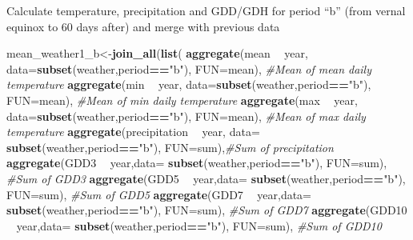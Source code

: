 \documentclass[10pt,]{article}
\newenvironment{Shaded}{\begin{snugshade}}{\end{snugshade}}
\newcommand{\KeywordTok}[1]{\textcolor[rgb]{0.13,0.29,0.53}{\textbf{#1}}}
\newcommand{\DataTypeTok}[1]{\textcolor[rgb]{0.13,0.29,0.53}{#1}}
\newcommand{\StringTok}[1]{\textcolor[rgb]{0.31,0.60,0.02}{#1}}
\newcommand{\CommentTok}[1]{\textcolor[rgb]{0.56,0.35,0.01}{\textit{#1}}}
\newcommand{\OperatorTok}[1]{\textcolor[rgb]{0.81,0.36,0.00}{\textbf{#1}}}
\newcommand{\NormalTok}[1]{#1}
\begin{document}
Calculate temperature, precipitation and GDD/GDH for period ``b'' (from
vernal equinox to 60 days after) and merge with previous data

\begin{Shaded}
\begin{Highlighting}[]
\NormalTok{mean_weather1_b<-}\KeywordTok{join_all}\NormalTok{(}\KeywordTok{list}\NormalTok{(}
    \KeywordTok{aggregate}\NormalTok{(mean }\OperatorTok{~}\StringTok{ }\NormalTok{year, }\DataTypeTok{data=}\KeywordTok{subset}\NormalTok{(weather,period}\OperatorTok{==}\StringTok{"b"}\NormalTok{), }\DataTypeTok{FUN=}\NormalTok{mean), }\CommentTok{#Mean of mean daily temperature}
    \KeywordTok{aggregate}\NormalTok{(min }\OperatorTok{~}\StringTok{ }\NormalTok{year, }\DataTypeTok{data=}\KeywordTok{subset}\NormalTok{(weather,period}\OperatorTok{==}\StringTok{"b"}\NormalTok{), }\DataTypeTok{FUN=}\NormalTok{mean), }\CommentTok{#Mean of min daily temperature}
    \KeywordTok{aggregate}\NormalTok{(max }\OperatorTok{~}\StringTok{ }\NormalTok{year, }\DataTypeTok{data=}\KeywordTok{subset}\NormalTok{(weather,period}\OperatorTok{==}\StringTok{"b"}\NormalTok{), }\DataTypeTok{FUN=}\NormalTok{mean), }\CommentTok{#Mean of max daily temperature}
    \KeywordTok{aggregate}\NormalTok{(precipitation }\OperatorTok{~}\StringTok{ }\NormalTok{year, }\DataTypeTok{data=} \KeywordTok{subset}\NormalTok{(weather,period}\OperatorTok{==}\StringTok{"b"}\NormalTok{), }\DataTypeTok{FUN=}\NormalTok{sum),}\CommentTok{#Sum of precipitation}
    \KeywordTok{aggregate}\NormalTok{(GDD3 }\OperatorTok{~}\StringTok{ }\NormalTok{year,}\DataTypeTok{data=} \KeywordTok{subset}\NormalTok{(weather,period}\OperatorTok{==}\StringTok{"b"}\NormalTok{), }\DataTypeTok{FUN=}\NormalTok{sum),          }\CommentTok{#Sum of GDD3}
    \KeywordTok{aggregate}\NormalTok{(GDD5 }\OperatorTok{~}\StringTok{ }\NormalTok{year,}\DataTypeTok{data=} \KeywordTok{subset}\NormalTok{(weather,period}\OperatorTok{==}\StringTok{"b"}\NormalTok{), }\DataTypeTok{FUN=}\NormalTok{sum),          }\CommentTok{#Sum of GDD5}
    \KeywordTok{aggregate}\NormalTok{(GDD7 }\OperatorTok{~}\StringTok{ }\NormalTok{year,}\DataTypeTok{data=} \KeywordTok{subset}\NormalTok{(weather,period}\OperatorTok{==}\StringTok{"b"}\NormalTok{), }\DataTypeTok{FUN=}\NormalTok{sum),          }\CommentTok{#Sum of GDD7}
    \KeywordTok{aggregate}\NormalTok{(GDD10 }\OperatorTok{~}\StringTok{ }\NormalTok{year,}\DataTypeTok{data=} \KeywordTok{subset}\NormalTok{(weather,period}\OperatorTok{==}\StringTok{"b"}\NormalTok{), }\DataTypeTok{FUN=}\NormalTok{sum),         }\CommentTok{#Sum of GDD10}

\end{Highlighting}
\end{Shaded}
\end{document}
